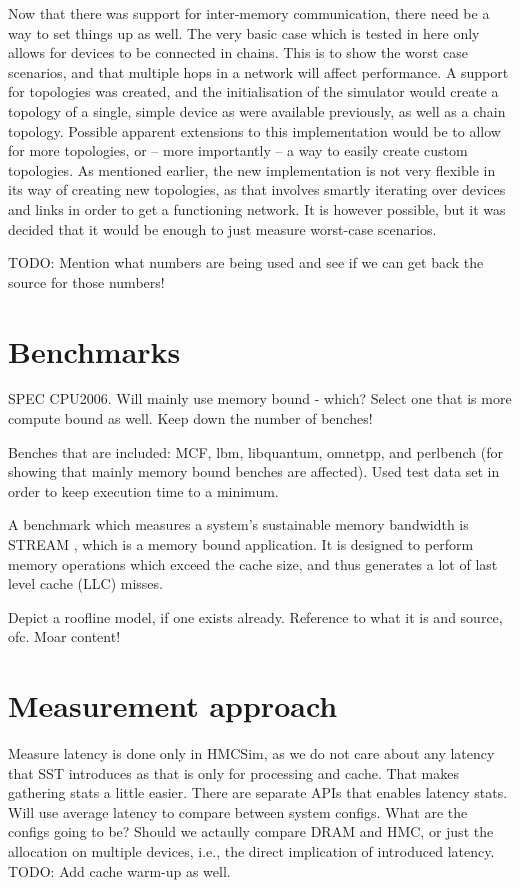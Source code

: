 Now that there was support for inter-memory communication, there need be a way to set things up as well. The very basic case which is tested in here only allows for devices to be connected in chains. This is to show the worst case scenarios, and that multiple hops in a network will affect performance. A support for topologies was created, and the initialisation of the simulator would create a topology of a single, simple device as were available previously, as well as a chain topology. Possible apparent extensions to this implementation would be to allow for more topologies, or -- more importantly -- a way to easily create custom topologies. As mentioned earlier, the new implementation is not very flexible in its way of creating new topologies, as that involves smartly iterating over devices and links in order to get a functioning network. It is however possible, but it was decided that it would be enough to just measure worst-case scenarios. 

TODO: Mention what numbers are being used and see if we can get back the source for those numbers!


\section{Benchmarks}
SPEC CPU2006. Will mainly use memory bound - which? Select one that is more compute bound as well. Keep down the number of benches!
\bigskip

Benches that are included:
MCF, lbm, libquantum, omnetpp, and perlbench (for showing that mainly memory bound benches are affected). Used test data set in order to keep execution time to a minimum.

A benchmark which measures a system's sustainable memory bandwidth is STREAM \cite{mccalpin1995memory}, which is a memory bound application. It is designed to perform memory operations which exceed the cache size, and thus generates a lot of last level cache (LLC) misses.

Depict a roofline model, if one exists already. Reference to what it is and source, ofc. Moar content!


\section{Measurement approach}
Measure latency is done only in HMCSim, as we do not care about any latency that SST introduces as that is only for processing and cache. That makes gathering stats a little easier. There are separate APIs that enables latency stats. Will use average latency to compare between system configs. What are the configs going to be? Should we actaully compare DRAM and HMC, or just the allocation on multiple devices, i.e., the direct implication of introduced latency. TODO: Add cache warm-up as well.
